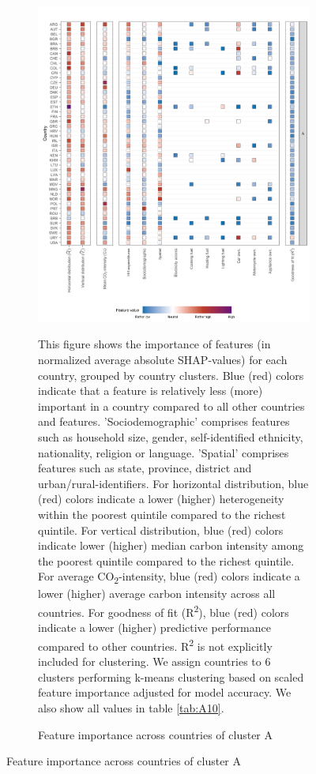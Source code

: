 \documentclass[12pt, a4paper]{article}
\newenvironment{subcaption2}
{\strut
\vspace{-5pt}
\begin{minipage}[b]{0.9\textwidth}
  \hspace*{-\parindent}
  \footnotesize}
 {\end{minipage}}
\begin{document}
\clearpage
\begin{figure}[ht!]
    \centering
    \caption{Feature importance across countries by cluster}\label{fig:fig_4}
    \begin{subfigure}[b]{\textwidth}
    \centering
    \caption{Feature importance across countries of cluster A}\label{fig:fig_4_1}
    \includegraphics{1_Figures/Figure 4/Figure_4_Corrected_1.jpg}
     \begin{subcaption2}
    This figure shows the importance of features (in normalized average absolute SHAP-values) for each country, grouped by country clusters. Blue (red) colors indicate that a feature is relatively less (more) important in a country compared to all other countries and features. 'Sociodemographic' comprises features such as household size, gender, self-identified ethnicity, nationality, religion or language. 'Spatial' comprises features such as state, province, district and urban/rural-identifiers. For horizontal distribution, blue (red) colors indicate a lower (higher) heterogeneity within the poorest quintile compared to the richest quintile. For vertical distribution, blue (red) colors indicate lower (higher) median carbon intensity among the poorest quintile compared to the richest quintile. For average CO\textsubscript{2}-intensity, blue (red) colors indicate a lower (higher) average carbon intensity across all countries. For goodness of fit (R\textsuperscript{2}), blue (red) colors indicate a lower (higher) predictive performance compared to other countries. R\textsuperscript{2} is not explicitly included for clustering.
    We assign countries to 6 clusters performing k-means clustering based on scaled feature importance adjusted for model accuracy. We also show all values in table \ref{tab:A10}.
    \end{subcaption2}
    \end{subfigure}
\end{figure}
\end{document}
